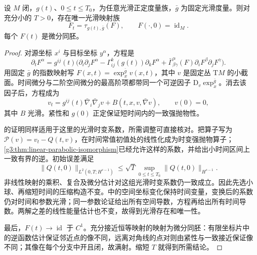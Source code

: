 \begin{lemma}\label{g3:lem:time-dependent-harmonic-gauge}
 设 \(M\) 闭，\(g(t)\)、\(0\le t\le T_0\)，为任意光滑正定度量族，\(\bar g\) 为固定光滑度量。则对充分小的 \(T>0\)，存在唯一光滑映射族
 \begin{equation}\label{g3:eq:ricci-harmonic-gauge-heat}
  F_t=\tau_{g(t),\bar g}(F),\qquad F(\cdot,0)=\operatorname{id}_M.
 \end{equation}
 每个 \(F(t)\) 是微分同胚。
\end{lemma}
\begin{proof}
 对源坐标 \(x^i\) 与目标坐标 \(y^\alpha\)，方程是
 \[
  \partial_tF^\alpha=g^{ij}(t)\bigl(
   \partial_i\partial_jF^\alpha
   -\Gamma^k_{ij}(g(t))\partial_kF^\alpha
   +\bar\Gamma^\alpha_{\beta\gamma}(F)
           \partial_iF^\beta\partial_jF^\gamma\bigr).
 \]
 用固定 \(\bar g\) 的指数映射写 \(F(x,t)=\exp_x^{\bar g}v(x,t)\)，其中 \(v\) 是固定丛 \(\mathrm TM\) 的小截面。时间微分与二阶空间微分的最高阶项都带同一个可逆因子 \(\mathrm D_v\exp_x^{\bar g}\)。消去该因子后，方程成为
 \[
  v_t=g^{ij}(t)\bar\nabla_i\bar\nabla_jv
       +B(t,x,v,\bar\nabla v),\qquad v(0)=0,
 \]
 其中 \(B\) 光滑。紧性和 \(g(0)\) 正定保证短时间内的一致强抛物性。

 的证明同样适用于这里的光滑时变系数，所需调整可直接核对。把算子写为 \(\mathscr P(v)=v_t-Q(t,v)\)，在时间常值初值处的线性化成为时变强抛物算子；\cref{g3:thm:linear-parabolic-isomorphism}已经允许这样的系数，并给出小时间区间上一致有界的逆。初始误差满足
 \[
  \|Q(t,0)\|_{L^2(0,T;H^{s-1})}
  \le\sqrt T\sup_{0\le t\le T_0}\|Q(t,0)\|_{H^{s-1}}.
 \]
 非线性映射的乘积、复合及微分估计对这组光滑时变系数仍一致成立。因此先选小球、再缩短时间的压缩构造不变。中的空间坐标变化保持时间变量，变换后的系数仍对时间和参数光滑；同一参数论证给出所有空间导数，方程再给出所有时间导数。两解之差的线性能量估计也不变，故得到光滑存在和唯一性。

 最后，\(F(t)\to\operatorname{id}\) 于 \(C^1\)。充分接近恒等映射的映射为微分同胚：有限坐标片中的逆函数估计保证邻近点的像不同，远离对角线的点对则由紧性与一致接近保证像不同；其像在每个分支中开且闭，故满射。缩短 \(T\) 就得到所需结论。
\end{proof}

